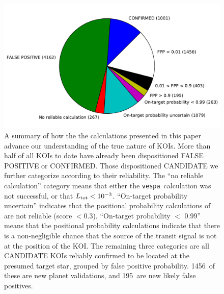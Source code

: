 \documentclass{emulateapj}
\newcommand{\figlabel}[1]{\label{fig:#1}}
\newcommand{\nvalnew}{1456}
\newcommand{\nfpnew}{195}
\newcommand{\posprobthresh}{0.3}
\newcommand{\vespa}{\texttt{vespa}}
\begin{document}
\begin{figure}[p]
\begin{center}
\includegraphics[width=7in]{figures/fpp_pie.pdf}
\end{center}
\caption{A summary of how the the calculations presented in this paper
  advance our understanding of the true nature of KOIs.  More than
  half of all KOIs to date have already been dispositioned FALSE
  POSITIVE or CONFIRMED.  Those dispositioned CANDIDATE we further
  categorize according to their reliability.  The ``no reliable
  calculation'' category means that either the \vespa\ calculation was
  not successful, or that $L_{\rm tot} < 10^{-3}$.  ``On-target
  probability uncertain'' indicates that the positional probability
  calculations of \citet{Bryson:KSCI} are not reliable (score $<
  \posprobthresh$).  ``On-target probability $<$ 0.99'' means that the positional
  probability calculations indicate that there is a non-negligible
  chance that the source of the transit signal is not at the position
  of the KOI.  The remaining three categories are all CANDIDATE KOIs
  reliably confirmed to be located at the presumed target star,
  grouped by false positive probability.  \nvalnew\ of these are new
  planet validations, and \nfpnew\ are new likely false positives.
  \figlabel{fpppie}}
\end{figure}
\end{document}
